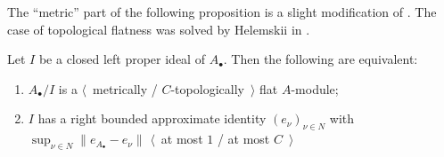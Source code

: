 The ``metric'' part of the following proposition is a slight modification of
\cite[proposition 4.11]{WhiteInjmoduAlg}. The case of topological flatness was
solved by Helemskii in \cite[theorem VII.1.20]{HelHomolBanTopAlg}.

\begin{proposition}\label{MetTopFlatCycModCharac} Let $I$ be a closed left proper ideal
of $A_\bullet $. Then the following are equivalent:

\begin{enumerate}[label = (\roman*)]
    \item $A_\bullet /I$ is a $\langle$~metrically / $C$-topologically~$\rangle$
    flat $A$-module;

    \item $I$ has a right bounded approximate identity ${(e_\nu)}_{\nu\in N}$
    with $\sup_{\nu\in N}\lVert e_{A_\bullet }-e_\nu\rVert$ $\langle$~at most $1$ /
    at most $C$~$\rangle$
\end{enumerate}
\end{proposition}
